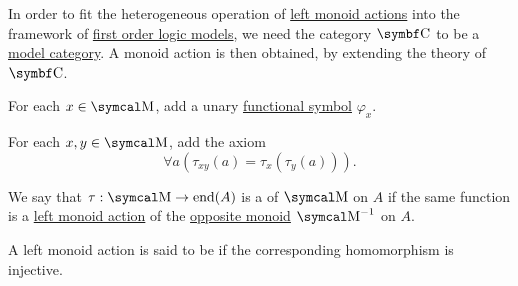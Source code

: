 \begin{remark}\label{remark:theory_of_left_monoid_actions}
  In order to fit the heterogeneous operation of \hyperref[def:left_monoid_action]{left monoid actions} into the framework of \hyperref[def:first_order_model]{first order logic models}, we need the category \( \Cat{C} \) to be a \hyperref[def:first_order_model_category]{model category}. A monoid action is then obtained, by extending the theory of \( \Cat{C} \).

  \begin{RemEnum}
     For each \( x \in \CM \), add a unary \hyperref[def:first_order_logic_alphabet/func]{functional symbol} \( \varphi_x \).

     For each \( x, y \in \CM \), add the axiom
    \begin{equation}\label{eq:remark:theory_of_left_monoid_actions/axiom_schema}
      \forall a (\tau_{xy}(a) = \tau_x(\tau_y(a))).
    \end{equation}
  \end{RemEnum}
\end{remark}

\begin{definition}\label{def:right_monoid_action}
  We say that \( \tau: \CM \to \End(A) \) is a  of \( \CM \) on \( A \) if the same function is a \hyperref[def:left_monoid_action]{left monoid action} of the \hyperref[def:magma/opposite]{opposite monoid} \( \CM^{-1} \) on \( A \).
\end{definition}

\begin{definition}\label{def:faithful_left_monoid_action}
  A left monoid action is said to be  if the corresponding homomorphism is injective.
\end{definition}

